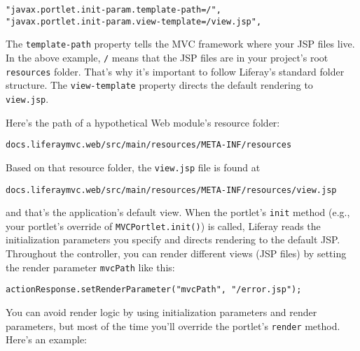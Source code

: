 \begin{verbatim}
"javax.portlet.init-param.template-path=/",
"javax.portlet.init-param.view-template=/view.jsp",
\end{verbatim}

The \texttt{template-path} property tells the MVC framework where your
JSP files live. In the above example, \texttt{/} means that the JSP
files are in your project's root \texttt{resources} folder. That's why
it's important to follow Liferay's standard folder structure. The
\texttt{view-template} property directs the default rendering to
\texttt{view.jsp}.

Here's the path of a hypothetical Web module's resource folder:

\begin{verbatim}
docs.liferaymvc.web/src/main/resources/META-INF/resources
\end{verbatim}

Based on that resource folder, the \texttt{view.jsp} file is found at

\begin{verbatim}
docs.liferaymvc.web/src/main/resources/META-INF/resources/view.jsp
\end{verbatim}

and that's the application's default view. When the portlet's
\texttt{init} method (e.g., your portlet's override of
\texttt{MVCPortlet.init()}) is called, Liferay reads the initialization
parameters you specify and directs rendering to the default JSP.
Throughout the controller, you can render different views (JSP files) by
setting the render parameter \texttt{mvcPath} like this:

\begin{verbatim}
actionResponse.setRenderParameter("mvcPath", "/error.jsp");
\end{verbatim}

You can avoid render logic by using initialization parameters and render
parameters, but most of the time you'll override the portlet's
\texttt{render} method. Here's an example:

